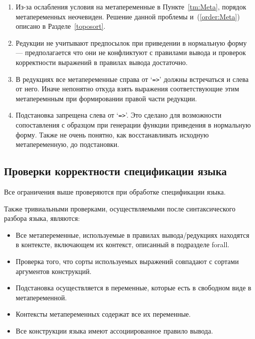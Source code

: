 \begin{enumerate}
\item Из-за ослабления условия на метапеременные в Пункте~\ref{tm:Meta}, порядок метапеременных неочевиден. Решение данной проблемы и~(\ref{order:Meta}) описано в Разделе~\ref{toposort}.

\item Редукции не учитывают предпосылок при приведении в нормальную форму --- предполагается что они не конфликтуют с правилами вывода и проверок корректности выражений в правилах вывода достаточно.

\item В редукциях все метапеременные справа от `\lstinline{=>}' должны встречаться и слева от него. Иначе непонятно откуда взять выражения соответствующие этим метаперемнным при формировании правой части редукции.

\item Подстановка запрещена слева от `\lstinline{=>}'. Это сделано для возможности сопоставления с образцом при генерации функции приведения в нормальную форму. Также не очень понятно, как восстанавливать исходную метапеременную, до подстановки.


\end{enumerate}

\subsection{Проверки корректности спецификации языка}

Все ограничения выше проверяются при обработке спецификации языка.

Также тривиальными проверками, осуществляемыми после синтаксического разбора языка, являются:
\begin{itemize}
\item Все метапеременные, используемые в правилах вывода/редукциях находятся в контексте, включающем их контекст, описанный в подразделе forall.
\item Проверка того, что сорты используемых выражений совпадают с сортами аргументов конструкций.
\item Подстановка осуществляется в переменные, которые есть в свободном виде в метапеременной.
\item Контексты метапеременных содержат все их переменные.
\item Все конструкции языка имеют ассоциированное правило вывода.
\end{itemize}
